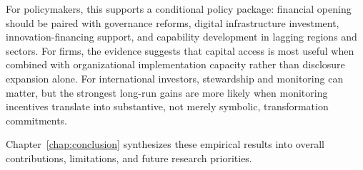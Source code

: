 For policymakers, this supports a conditional policy package: financial opening should be paired with governance reforms, digital infrastructure investment, innovation-financing support, and capability development in lagging regions and sectors. For firms, the evidence suggests that capital access is most useful when combined with organizational implementation capacity rather than disclosure expansion alone. For international investors, stewardship and monitoring can matter, but the strongest long-run gains are more likely when monitoring incentives translate into substantive, not merely symbolic, transformation commitments.

Chapter~\ref{chap:conclusion} synthesizes these empirical results into overall contributions, limitations, and future research priorities.
